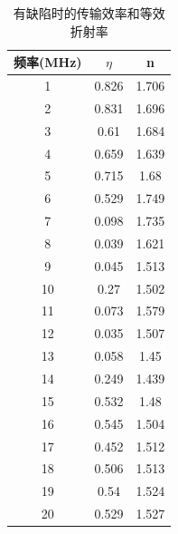 \documentclass[fleqn,10pt]{SelfArx} %
\begin{document}
\begin{table}[h]
	\centering
	\begin{tabular}{|c|c|c|}
	\hline
	频率(MHz) & $\eta$ & n     \\ \hline
	1      & 0.826  & 1.706 \\ \hline
	2      & 0.831  & 1.696 \\ \hline
	3      & 0.61   & 1.684 \\ \hline
	4      & 0.659  & 1.639 \\ \hline
	5      & 0.715  & 1.68  \\ \hline
	6      & 0.529  & 1.749 \\ \hline
	7      & 0.098  & 1.735 \\ \hline
	8      & 0.039  & 1.621 \\ \hline
	9      & 0.045  & 1.513 \\ \hline
	10     & 0.27   & 1.502 \\ \hline
	11     & 0.073  & 1.579 \\ \hline
	12     & 0.035  & 1.507 \\ \hline
	13     & 0.058  & 1.45  \\ \hline
	14     & 0.249  & 1.439 \\ \hline
	15     & 0.532  & 1.48  \\ \hline
	16     & 0.545  & 1.504 \\ \hline
	17     & 0.452  & 1.512 \\ \hline
	18     & 0.506  & 1.513 \\ \hline
	19     & 0.54   & 1.524 \\ \hline
	20     & 0.529  & 1.527 \\ \hline
	\end{tabular}
	\caption{有缺陷时的传输效率和等效折射率}
	\label{tab:app5}
\end{table}
\end{document}
